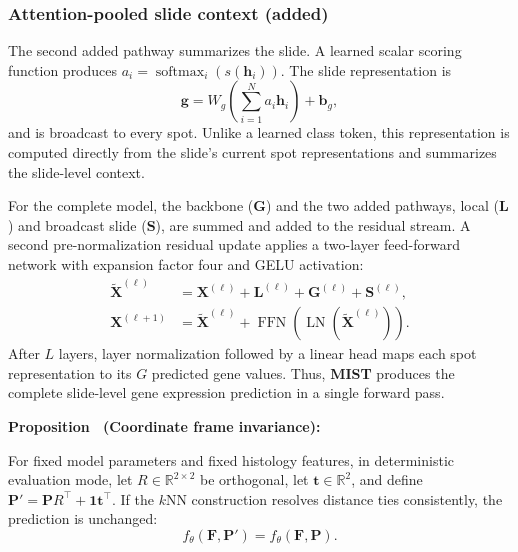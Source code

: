\documentclass[11pt]{article}
\newcommand{\morph}{\textbf{MIST}}
\begin{document}
\subsubsection{Attention-pooled slide context (added)}
The second added pathway summarizes the slide. A learned scalar scoring function produces
$a_i=\operatorname{softmax}_{i}(s(\mathbf{h}_i))$. The slide representation is
\begin{equation}
\mathbf{g}=W_g\left(\sum_{i=1}^{N}a_i\mathbf{h}_i\right)+\mathbf{b}_g,
\end{equation}
and is broadcast to every spot. Unlike a learned class token, this representation is computed
directly from the slide's current spot representations and summarizes the slide-level context.

For the complete model, the backbone ($\mathbf{G}$) and the two added pathways, local
($\mathbf{L}$) and broadcast slide ($\mathbf{S}$), are summed and added to the residual stream. A
second pre-normalization residual update applies a two-layer feed-forward network with expansion
factor four and GELU activation:
\begin{align}
\widetilde{\mathbf{X}}^{(\ell)}
  &=\mathbf{X}^{(\ell)}+\mathbf{L}^{(\ell)}+\mathbf{G}^{(\ell)}+\mathbf{S}^{(\ell)},\\
\mathbf{X}^{(\ell+1)}
  &=\widetilde{\mathbf{X}}^{(\ell)}+
    \operatorname{FFN}\!\left(\operatorname{LN}(\widetilde{\mathbf{X}}^{(\ell)})\right).
\end{align}
After $L$ layers, layer normalization followed by a linear head maps each spot representation to its $G$ predicted gene values. Thus, \morph{} produces the complete slide-level gene expression prediction in a single forward pass.


\par\noindent{}\textbf{Proposition \theproposition\ (Coordinate frame invariance):}\label{prop:coordinate_invariance}\par
For fixed model parameters and fixed histology features, in deterministic evaluation mode, let
$R\in\mathbb{R}^{2\times2}$ be orthogonal, let $\mathbf{t}\in\mathbb{R}^{2}$, and define
$\mathbf{P}'=\mathbf{P}R^\top+\mathbf{1}\mathbf{t}^\top$. If the $k$NN construction resolves distance
ties consistently, the prediction is unchanged:
\begin{equation}
f_\theta(\mathbf{F},\mathbf{P}')=f_\theta(\mathbf{F},\mathbf{P}).
\end{equation}
\end{document}
